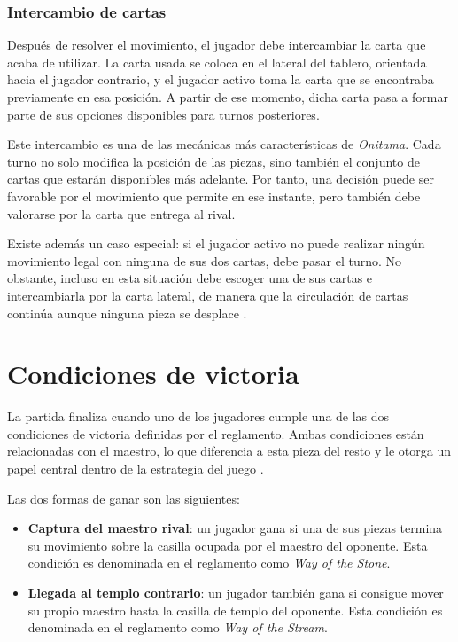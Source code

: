 \subsubsection*{Intercambio de cartas}

Después de resolver el movimiento, el jugador debe intercambiar la carta que acaba de utilizar. La carta usada se coloca en el lateral del tablero, orientada hacia el jugador contrario, y el jugador activo toma la carta que se encontraba previamente en esa posición. A partir de ese momento, dicha carta pasa a formar parte de sus opciones disponibles para turnos posteriores.

Este intercambio es una de las mecánicas más características de \textit{Onitama}. Cada turno no solo modifica la posición de las piezas, sino también el conjunto de cartas que estarán disponibles más adelante. Por tanto, una decisión puede ser favorable por el movimiento que permite en ese instante, pero también debe valorarse por la carta que entrega al rival.

Existe además un caso especial: si el jugador activo no puede realizar ningún movimiento legal con ninguna de sus dos cartas, debe pasar el turno. No obstante, incluso en esta situación debe escoger una de sus cartas e intercambiarla por la carta lateral, de manera que la circulación de cartas continúa aunque ninguna pieza se desplace \cite{onitama_rulebook}.


\section{Condiciones de victoria}
\label{sec:condiciones-victoria-onitama}

La partida finaliza cuando uno de los jugadores cumple una de las dos condiciones de victoria definidas por el reglamento. Ambas condiciones están relacionadas con el maestro, lo que diferencia a esta pieza del resto y le otorga un papel central dentro de la estrategia del juego \cite{onitama_rulebook}.

Las dos formas de ganar son las siguientes:

\begin{itemize}
    \item \textbf{Captura del maestro rival}: un jugador gana si una de sus piezas termina su movimiento sobre la casilla ocupada por el maestro del oponente. Esta condición es denominada en el reglamento como \textit{Way of the Stone}.
    
    \item \textbf{Llegada al templo contrario}: un jugador también gana si consigue mover su propio maestro hasta la casilla de templo del oponente. Esta condición es denominada en el reglamento como \textit{Way of the Stream}.
\end{itemize}

